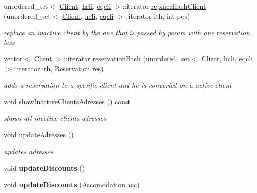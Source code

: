 \begin{DoxyCompactItemize}
unordered\+\_\+set$<$ \hyperlink{class_client}{Client}, \hyperlink{structhcli}{hcli}, \hyperlink{structeqcli}{eqcli} $>$\+::iterator \hyperlink{class_company_a19b18b69d4ebffc02ca415c8256f7696}{replace\+Hash\+Client} (unordered\+\_\+set$<$ \hyperlink{class_client}{Client}, \hyperlink{structhcli}{hcli}, \hyperlink{structeqcli}{eqcli} $>$\+::iterator ith, int pos)
\begin{DoxyCompactList}\small\item\em replace an inactive client by the one that is passed by param with one reservation less \end{DoxyCompactList}\item 
vector$<$ \hyperlink{class_client}{Client} $>$\+::iterator \hyperlink{class_company_ab94adc44faec0f3975c9b7bf7b7e3c56}{reservation\+Hash} (unordered\+\_\+set$<$ \hyperlink{class_client}{Client}, \hyperlink{structhcli}{hcli}, \hyperlink{structeqcli}{eqcli} $>$\+::iterator ith, \hyperlink{class_reservation}{Reservation} res)
\begin{DoxyCompactList}\small\item\em adds a reservation to a specific client and he is converted on a active client \end{DoxyCompactList}\item 
\hypertarget{class_company_ad87ded060d38ae710f658dbb3ffe3c11}{}\label{class_company_ad87ded060d38ae710f658dbb3ffe3c11} 
void \hyperlink{class_company_ad87ded060d38ae710f658dbb3ffe3c11}{show\+Inactive\+Clients\+Adresses} () const
\begin{DoxyCompactList}\small\item\em shows all inactive clients adresses \end{DoxyCompactList}\item 
\hypertarget{class_company_ae052582ab021824788025429dd64e61f}{}\label{class_company_ae052582ab021824788025429dd64e61f} 
void \hyperlink{class_company_ae052582ab021824788025429dd64e61f}{update\+Adresses} ()
\begin{DoxyCompactList}\small\item\em updates adresses \end{DoxyCompactList}\item 
\hypertarget{class_company_a42afa0c16729d90a1e92ee09d30b5cae}{}\label{class_company_a42afa0c16729d90a1e92ee09d30b5cae} 
void {\bfseries update\+Discounts} ()
\item 
\hypertarget{class_company_a77210cc429f144c81f86e385c829bad2}{}\label{class_company_a77210cc429f144c81f86e385c829bad2} 
void {\bfseries update\+Discounts} (\hyperlink{class_accomodation}{Accomodation} acc)
\end{DoxyCompactItemize}


